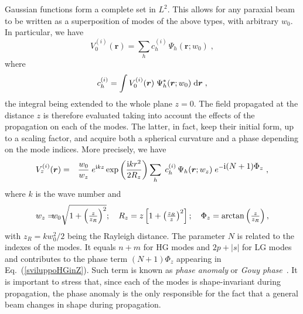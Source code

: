 \documentclass{article}
\newcommand{\bs}{\boldsymbol}
\begin{document}
Gaussian functions form a complete set in $L^2$. This allows for any paraxial beam to be written as a superposition of modes of the above types, with arbitrary $w_0$. In particular, we have
%
\begin{equation}
\label{sviluppoHGin0}
V^{(i)}_0({\bs r})
=
\displaystyle\sum_{h}
c^{(i)}_{h}
\,
{\Psi}_{h}({\bs r}; w_0)
\; ,
\end{equation}
%
where
%
\begin{equation}
c^{(i)}_{h}
=
\displaystyle\int\limits
V^{(i)}_0({\bs r})
\;
{\Psi}^*_{h}({\bs r}; w_0)
\; {\rm d}{\bs r}
\; ,
\label{coefficientiHG}
\end{equation}
%
the integral being extended to the whole plane $z=0$. The field propagated at the distance $z$ is therefore evaluated taking into account the effects of the propagation on each of the modes. The latter, in fact, keep their initial form, up to a scaling factor, and acquire both a spherical curvature and a phase depending on the mode indices. More precisely,  we have
%
\begin{equation}
\begin{array}{rl}
V^{(i)}_z({\bs r})
=
&
\displaystyle\frac{w_0}{w_z}
\; e^{{\rm i}kz}
\exp\left(\frac{{\rm i}k r^2}{2 R_z}\right)
\displaystyle\sum_{h}
\; c^{(i)}_{h}
\,
{\Psi}_{h}({\bs r}; w_z)
\; e^{- \displaystyle {\rm i} (N+1) \Phi_z}
\; ,
\end{array}
\label{sviluppoHGinZ}
\end{equation}
%
where $k$ is the wave number and
%
\begin{eqnarray}
\begin{array}{c}
w_z
=  \hspace{-2mm} 
w_0
\sqrt{1 + \left(\frac{z}{z_R}\right)^2}
; \,\,\, \,\,\,
R_z
=
z
\left[1 + \left(\frac{z_R}{z}\right)^2\right]; \,\,\, \,\,\,
 \Phi_z
=
\arctan
\left(\frac{z}{z_R}\right) 
, 
\end{array}
\label{parameters}
\end{eqnarray}
%
with $z_R=k w_0^2/2$ being the Rayleigh distance. The parameter $N$ is related to the indexes of the modes. It equals $n+m$ for HG modes and $2 p + |s|$ for LG modes and contributes to the phase term $(N+1) \Phi_z$ appearing in Eq.~(\ref{sviluppoHGinZ}). Such term is known as \emph{phase anomaly} or \emph{Gouy phase}~\cite{Siegman:Lasers86}. It is important to stress that, since each of the modes is shape-invariant during propagation, the phase anomaly is the only responsible for the fact that a general beam changes in shape during propagation.
\end{document}
